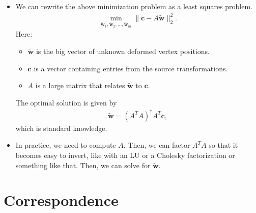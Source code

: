 \documentclass[10pt]{article}
\newcommand{\ve}[1]{\mathbf{#1}}
\begin{document}
\begin{itemize}
    \item We can rewrite the above minimization problem as a least squares problem.
    \begin{align*}
        \min_{\widetilde{\ve{w}}_1, \widetilde{\ve{w}}_2, \ldots, \widetilde{\ve{w}}_m} 
        \| \ve{c} - A\widetilde{\ve{w}} \|_2^2.
    \end{align*}
    Here:
    \begin{itemize}
        \item $\widetilde{\ve{w}}$ is the big vector of unknown deformed vertex positions.
        \item $\ve{c}$ is a vector containing entries from the source transformations.
        \item $A$ is a large matrix that relates $\widetilde{\ve{w}}$ to $\ve{c}$.
    \end{itemize}
    The optimal solution is given by
    \begin{align*}
        \widetilde{\ve{w}} = (A^T A)^{\dagger} A^T \ve{c},
    \end{align*}
    which is standard knowledge.

    \item In practice, we need to compute $A$. Then, we can factor $A^T A$ so that it becomes easy to invert, like with an LU or a Cholesky factorization or something like that. Then, we can solve for $\widetilde{\ve{w}}$.
\end{itemize}

\section{Correspondence}
\end{document}
